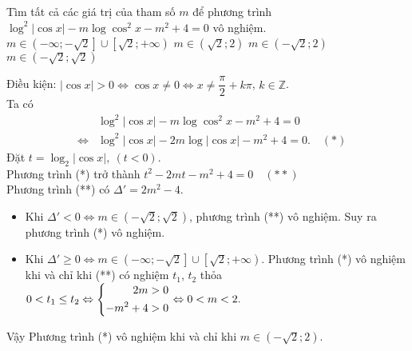 \begin{ex}%
	Tìm tất cả các giá trị của tham số $ m $ để phương trình $ \log^2|\cos x| - m \log \cos^2x - m^2 + 4 = 0 $ vô nghiệm.
	\choice
	{$m \in \left(-\infty;-\sqrt{2}\right] \cup \left[ \sqrt{2};+\infty \right) $}
	{$ m \in \left(\sqrt{2};2\right) $}
	{\True $ m \in  \left(-\sqrt{2};2\right)$}
	{$ m \in \left(-\sqrt{2};\sqrt{2}\right) $}
	\loigiai
	{Điều kiện: $  |\cos x |>0 \Leftrightarrow \cos x \ne 0 \Leftrightarrow x \ne \dfrac{\pi}{2} + k \pi   $, $ k \in \mathbb{Z} $.\\
		Ta có \begin{eqnarray*}
&&\log^2|\cos x| - m \log \cos^2x - m^2 + 4 = 0 
\\&\Leftrightarrow& \log^2|\cos x| - 2m \log |\cos x| - m^2 + 4 = 0. \quad (*)
		\end{eqnarray*} 
		Đặt $ t = \log_2 |\cos x|,\ (t<0) $.\\ Phương trình (*) trở thành $ t^2 - 2mt - m^2 + 4 = 0 \quad (**)$ \\
		Phương trình (**) có $ \Delta' = 2m^2 - 4 $.
		\begin{itemize}
			\item Khi $ \Delta' < 0 \Leftrightarrow m \in \left(-\sqrt{2}; \sqrt{2}\right) $, phương trình (**) vô nghiệm. Suy ra phương trình (*) vô nghiệm. 
			\item Khi $ \Delta' \ge 0 \Leftrightarrow m \in \left(-\infty;-\sqrt{2}\right]
 \cup \left[\sqrt{2};+\infty \right)	$. Phương trình (*)	 vô nghiệm khi và chỉ khi (**) có nghiệm $ t_1 $, $ t_2 $ thỏa $ 0 < t_1 \leq t_2 \Leftrightarrow \left\{\begin{aligned}2m &> 0 \\ -m^2 + 4 &> 0 \end{aligned}\right. \Leftrightarrow 0 < m < 2. $
 \end{itemize}
	Vậy	Phương trình (*) vô nghiệm khi và chỉ khi $ m \in \left(-\sqrt{2}; 2\right) $. 
		
	}
\end{ex}
